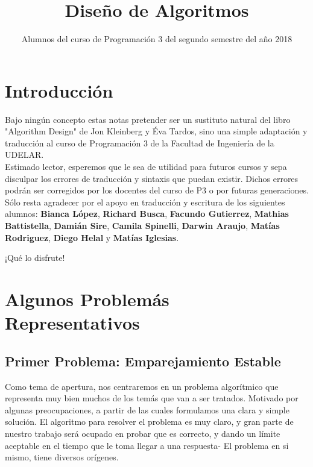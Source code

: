 \documentclass[a4paper]{article}
\title{Diseño de Algoritmos}
\author{Alumnos del curso de Programación 3 del segundo semestre del año 2018}
\begin{document}
\maketitle	
\newpage  
\tableofcontents
\newpage

\newpage


\section*{Introducción}

Bajo ningún concepto estas notas pretender ser un sustituto natural del libro "Algorithm Design" de Jon Kleinberg y Éva Tardos, sino una simple adaptación y traducción al curso de Programación 3 de la Facultad de Ingeniería de la UDELAR. \\

Estimado lector, esperemos que le sea de utilidad para futuros cursos y sepa disculpar los errores de traducción y sintaxis que puedan existir. Dichos errores podrán ser corregidos por los docentes del curso de P3 o por futuras generaciones.\\

Sólo resta agradecer por el apoyo en traducción y escritura de los siguientes alumnos: \textbf{Bianca López}, \textbf{Richard Busca}, \textbf{Facundo Gutierrez},\textbf{ Mathias Battistella}, \textbf{Damián Sire}, \textbf{Camila Spinelli}, \textbf{Darwin Araujo},  \textbf{Matías Rodriguez}, \textbf{Diego Helal} y \textbf{Matías Iglesias}. \\

\begin{center}
\huge{¡Qué lo disfrute!}
\end{center}



\newpage

\section{ Algunos Problemás Representativos}
\subsection{Primer Problema: Emparejamiento Estable}
Como tema de apertura, nos centraremos en un problema algorítmico que representa muy bien muchos de los temás que van a ser tratados. Motivado por algunas preocupaciones, a partir de las cuales formulamos una clara y simple solución. El algoritmo para resolver el problema es muy claro,  y gran parte de nuestro trabajo será ocupado en probar que es correcto, y dando un límite aceptable en el tiempo que le toma llegar a una respuesta- El problema en si mismo, tiene diversos orígenes.
\end{document}
